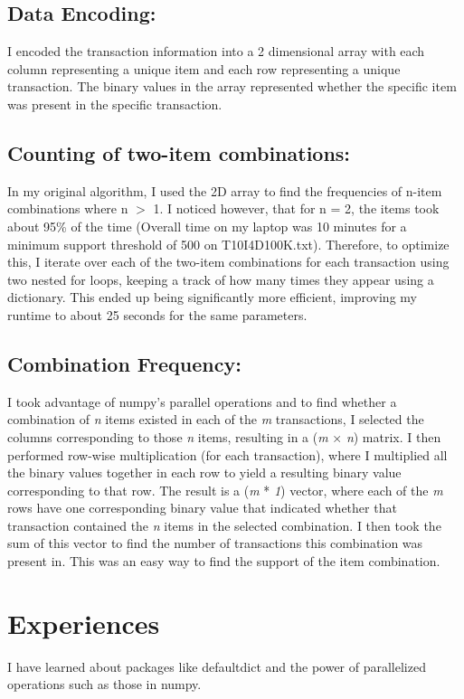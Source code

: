 \documentclass{article}
\begin{document}
\subsection{Data Encoding:} I encoded the transaction information into a 2 dimensional array with each column representing a unique item and each row representing a unique transaction. The binary values in the array represented whether the specific item was present in the specific transaction.  

\subsection{Counting of two-item combinations:} In my original algorithm, I used the 2D array to find the frequencies of n-item combinations where n $>$ 1. I noticed however, that for n = 2, the items took about 95\% of the time (Overall time on my laptop was 10 minutes for a minimum support threshold of 500 on T10I4D100K.txt). Therefore, to optimize this, I iterate over each of the two-item combinations for each transaction using two nested for loops, keeping a track of how many times they appear using a dictionary. This ended up being significantly more efficient, improving my runtime to about 25 seconds for the same parameters.

\subsection{Combination Frequency:} I took advantage of numpy's parallel operations and to find whether a combination of \textit{n} items existed in each of the \textit{m} transactions, I selected the columns corresponding to those \textit{n} items, resulting in a (\textit{m} × \textit{n}) matrix. I then performed row-wise multiplication (for each transaction), where I multiplied all the binary values together in each row to yield a resulting binary value corresponding to that row. The result is a (\textit{m} * \textit{1}) vector, where each of the \textit{m} rows have one corresponding binary value that indicated whether that transaction contained the \textit{n} items in the selected combination. I then took the sum of this vector to find the number of transactions this combination was present in. This was an easy way to find the support of the item combination.


\section{Experiences}
I have learned about packages like defaultdict and the power of parallelized operations such as those in numpy.
\end{document}
